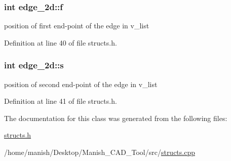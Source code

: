 \subsubsection[{\texorpdfstring{f}{f}}]{\setlength{\rightskip}{0pt plus 5cm}int edge\+\_\+2d\+::f}\hypertarget{classedge__2d_ad73d78b82f27e853c66ba2c5ada41cc3}{}\label{classedge__2d_ad73d78b82f27e853c66ba2c5ada41cc3}


position of first end-\/point of the edge in v\+\_\+list 



Definition at line 40 of file structs.\+h.

\subsubsection[{\texorpdfstring{s}{s}}]{\setlength{\rightskip}{0pt plus 5cm}int edge\+\_\+2d\+::s}\hypertarget{classedge__2d_ad3170a4b517acc63b33d02ed73674e8f}{}\label{classedge__2d_ad3170a4b517acc63b33d02ed73674e8f}


position of second end-\/point of the edge in v\+\_\+list 



Definition at line 41 of file structs.\+h.



The documentation for this class was generated from the following files\+:\begin{DoxyCompactItemize}
\item 
\hyperlink{structs_8h}{structs.\+h}\item 
/home/manish/\+Desktop/\+Manish\+\_\+\+C\+A\+D\+\_\+\+Tool/src/\hyperlink{structs_8cpp}{structs.\+cpp}\end{DoxyCompactItemize}
